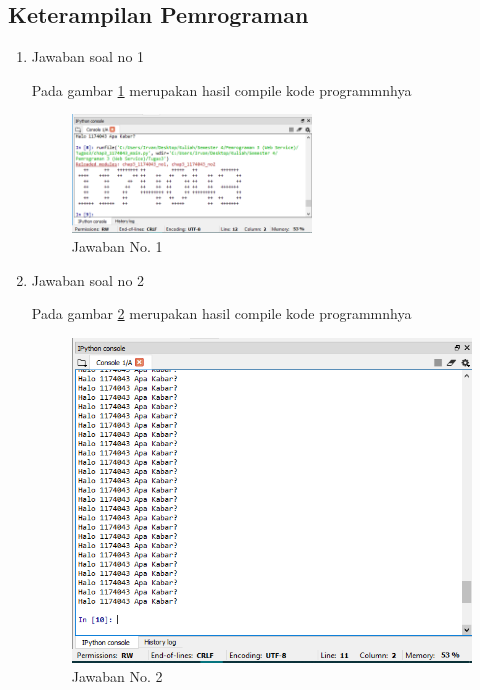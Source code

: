 	\subsection{Keterampilan Pemrograman}
		\begin{enumerate}
			\item Jawaban soal no 1
				
				
				\subitem Pada gambar \ref{gambar1} merupakan hasil compile kode programmnhya

				\begin{figure} [ht]
					\centerline{\includegraphics[width=0.6\textwidth]{figures/chapter3/1_1174043.png}}
					\caption{Jawaban No. 1}
					\label{gambar1}
				\end{figure}

				
				
			\item Jawaban soal no 2
				

				\subitem Pada gambar \ref{gambar2} merupakan hasil compile kode programmnhya

				\begin{figure} [ht]
					\centerline{\includegraphics[width=1\textwidth]{figures/chapter3/2_1174043.png}}
					\caption{Jawaban No. 2}
					\label{gambar2}
				\end{figure}


\end{enumerate}
